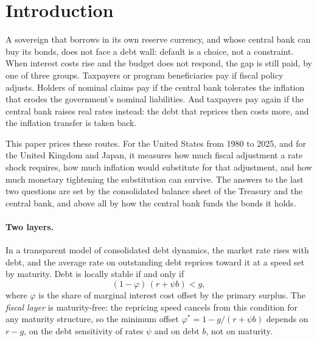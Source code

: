 \section{Introduction}\label{sec:intro}

A sovereign that borrows in its own reserve currency, and whose central bank can buy its bonds, does not face a debt wall: default is a choice, not a constraint. When interest costs rise and the budget does not respond, the gap is still paid, by one of three groups. Taxpayers or program beneficiaries pay if fiscal policy adjusts. Holders of nominal claims pay if the central bank tolerates the inflation that erodes the government's nominal liabilities. And taxpayers pay again if the central bank raises real rates instead: the debt that reprices then costs more, and the inflation transfer is taken back.

This paper prices these routes. For the United States from 1980 to 2025, and for the United Kingdom and Japan, it measures how much fiscal adjustment a rate shock requires, how much inflation would substitute for that adjustment, and how much monetary tightening the substitution can survive. The answers to the last two questions are set by the consolidated balance sheet of the Treasury and the central bank, and above all by how the central bank funds the bonds it holds.

\paragraph{Two layers.} In a transparent model of consolidated debt dynamics, the market rate rises with debt, and the average rate on outstanding debt reprices toward it at a speed set by maturity. Debt is locally stable if and only if
\begin{equation}
(1-\varphi)\,(r+\psi b)<g,
\end{equation}
where $\varphi$ is the share of marginal interest cost offset by the primary surplus. The \emph{fiscal layer} is maturity-free: the repricing speed cancels from this condition for any maturity structure, so the minimum offset $\varphi^*=1-g/(r+\psi b)$ depends on $r-g$, on the debt sensitivity of rates $\psi$ and on debt $b$, not on maturity.

